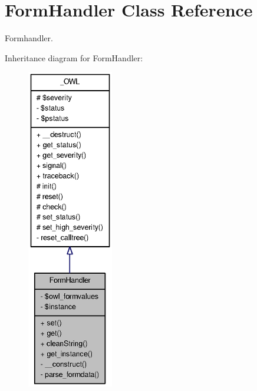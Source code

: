 \section{FormHandler Class Reference}
\label{classFormHandler}


Formhandler.  




Inheritance diagram for FormHandler:\nopagebreak
\begin{figure}[H]
\begin{center}
\leavevmode
\includegraphics[height=400pt]{classFormHandler__inherit__graph}
\end{center}
\end{figure}


